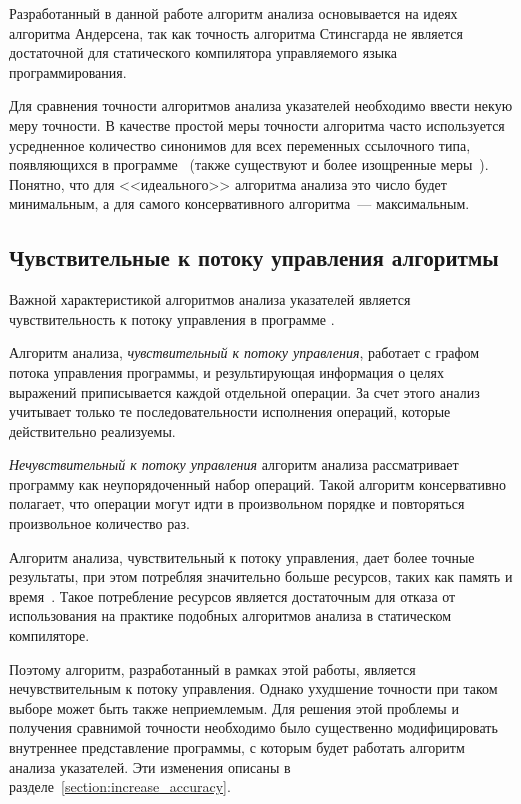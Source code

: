 \documentclass[14pt,titlepage,draft]{extarticle}
\begin{document}
    Разработанный в данной работе алгоритм анализа основывается на идеях
    алгоритма Андерсена, так как точность алгоритма Стинсгарда не является
    достаточной для статического компилятора управляемого языка
    программирования.

    Для сравнения точности алгоритмов анализа указателей необходимо ввести
    некую меру точности. В качестве простой меры точности алгоритма часто
    используется усредненное количество синонимов для всех переменных
    ссылочного типа, появляющихся в
    программе~\cite[раздел~3.2]{hind_pointer_analysis_not_solved_yet}
    (также существуют и более изощренные
    меры~\cite{hind_pointer_analysis_not_solved_yet,diwan_tbaa}).
    Понятно, что для <<идеального>> алгоритма анализа это число будет
    минимальным, а для самого консервативного алгоритма~--- максимальным.

  \subsection{Чувствительные к потоку управления алгоритмы}
    \label{section:choosing_flow_insensitive}

    Важной характеристикой алгоритмов анализа указателей является
    чувствительность к потоку управления в программе
    .

    Алгоритм анализа, \emph{чувствительный к потоку управления}, работает с
    графом потока управления программы, и результирующая информация о целях
    выражений приписывается каждой отдельной операции. За счет этого анализ
    учитывает только те последовательности исполнения операций, которые
    действительно реализуемы.

    \emph{Нечувствительный к потоку управления} алгоритм анализа рассматривает
    программу как неупорядоченный набор операций. Такой алгоритм
    консервативно полагает, что операции могут идти в произвольном порядке и
    повторяться произвольное количество раз.

    Алгоритм анализа, чувствительный к потоку управления, дает более точные
    результаты, при этом потребляя значительно больше ресурсов, таких как
    память и время~\cite[раздел.~4.4]{hind_pointer_analysis_not_solved_yet}.
    Такое потребление ресурсов является достаточным для отказа от
    использования на практике подобных алгоритмов анализа в статическом
    компиляторе.

    Поэтому алгоритм, разработанный в рамках этой работы, является
    нечувствительным к потоку управления. Однако ухудшение точности при таком
    выборе может быть также неприемлемым.
    Для решения этой проблемы и получения сравнимой точности необходимо было
    существенно модифицировать внутреннее представление программы, с которым
    будет работать алгоритм анализа указателей. Эти изменения описаны в
    разделе~\ref{section:increase_accuracy}.
\end{document}

